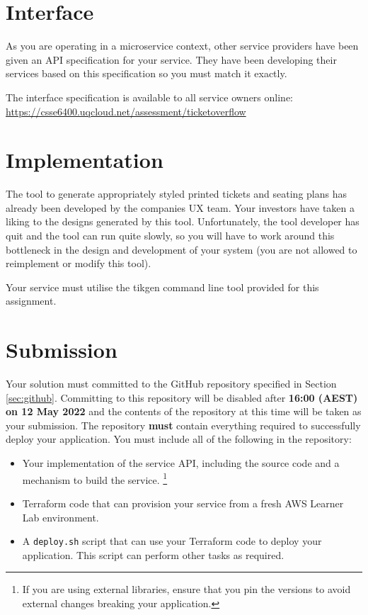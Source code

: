 \documentclass{csse4400}
\begin{document}
\section{Interface}
As you are operating in a microservice context,
other service providers have been given an API specification for your service.
They have been developing their services based on this specification so you must match it exactly.

The interface specification is available to all service owners online:
\url{https://csse6400.uqcloud.net/assessment/ticketoverflow}

\section{Implementation}
The tool to generate appropriately styled printed tickets and seating plans has already been developed by the companies UX team.
Your investors have taken a liking to the designs generated by this tool.
Unfortunately, the tool developer has quit and the tool can run quite slowly,
so you will have to work around this bottleneck in the design and development of your system (you are not allowed to reimplement or modify this tool).

Your service must utilise the tikgen command line tool provided for this assignment.

\section{Submission}
Your solution must committed to the GitHub repository specified in Section \ref{sec:github}.
Committing to this repository will be disabled after \textbf{16:00 (AEST) on 12 May 2022} and the contents of the repository at this time will be taken as your submission.
The repository \textbf{must} contain everything required to successfully deploy your application.
You must include all of the following in the repository:
\begin{itemize}
  \item Your implementation of the service API, including the source code and a mechanism to build the service.%
  \footnote{If you are using external libraries, ensure that you pin the versions to avoid external changes breaking your application.}
  \item Terraform code that can provision your service from a fresh AWS Learner Lab environment.
  \item A \texttt{deploy.sh} script that can use your Terraform code to deploy your application.
    This script can perform other tasks as required.
\end{itemize}
\end{document}
